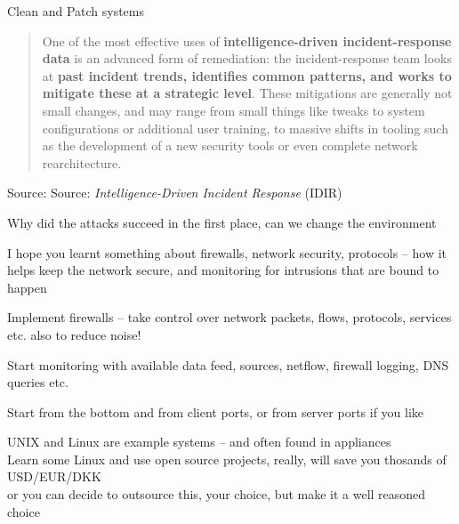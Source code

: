 \documentclass[Screen16to9,17pt]{foils}
\begin{document}
\begin{list2}
\item Clean and Patch systems
\end{list2}




\begin{quote}
One of the most effective uses of {\bf intelligence-driven incident-response data} is an
advanced form of remediation: the incident-response team looks at {\bf past incident
trends, identifies common patterns, and works to mitigate these at a strategic level}.
These mitigations are generally not small changes, and may range from small things
like tweaks to system configurations or additional user training, to massive shifts in
tooling such as the development of a new security tools or even complete network
rearchitecture.
\end{quote}
Source: Source: \emph{Intelligence-Driven Incident Response} (IDIR)

\begin{list2}
\item Why did the attacks succeed in the first place, can we change the environment
\end{list2}




I hope you learnt something about firewalls, network security, protocols -- how it helps keep the network secure, and monitoring for intrusions that are bound to happen

\begin{list2}
\item Implement firewalls – take control over network packets, flows, protocols, services etc.
also to reduce noise!
\item Start monitoring with available data feed, sources, netflow, firewall logging, DNS queries etc.
\item Start from the bottom and from client ports, or from server ports if you like

\item UNIX and Linux are example systems -- and often found in appliances\\
Learn some Linux and use open source projects, really, will save you thosands of USD/EUR/DKK\\
or you can decide to outsource this, your choice, but make it a well reasoned choice

\end{list2}
\end{document}
